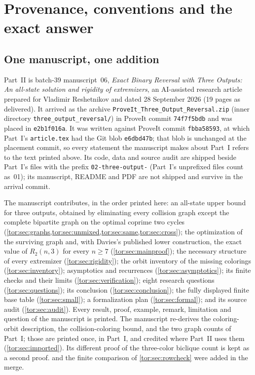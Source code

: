 \documentclass[11pt,a4paper]{article}
\numberwithin{equation}{section}
\theoremstyle{definition}
\theoremstyle{remark}
\begin{document}
\section{Provenance, conventions and the exact answer}\label{tor:sec:intro}

\subsection{One manuscript, one addition}\label{tor:sec:source}

Part~II is batch-39 manuscript~06, \emph{Exact Binary Reversal with Three
Outputs: An all-state solution and rigidity of extremizers}, an AI-assisted
research article prepared for Vladimir Reshetnikov and dated 28 September
2026 (19 pages as delivered). It arrived as the archive
\texttt{ProveIt\_Three\_Output\_Reversal.zip} (inner directory
\texttt{three\_output\_reversal/}) in ProveIt commit \texttt{74f7f5bdb} and was
placed in \texttt{e2b1f016a}. It was written against ProveIt commit
\texttt{fbba58593}, at which Part~I's \texttt{article.tex} had the Git blob
\texttt{e6dbd47b}; that blob is unchanged at the placement commit, so every
statement the manuscript makes about Part~I refers to the text printed above.
Its code, data and source audit are shipped beside Part~I's files with the
prefix \texttt{02-three-output-} (Part~I's unprefixed files count as~01); its
manuscript, README and PDF are not shipped and survive in the arrival commit.

The manuscript contributes, in the order printed here: an all-state upper
bound for three outputs, obtained by eliminating every collision graph except
the complete bipartite graph on the optimal coprime two cycles
(\cref{tor:sec:graphs,tor:sec:unmixed,tor:sec:same,tor:sec:cross}); the
optimization of the surviving graph and, with Davies's published lower
construction, the exact value of $R_2(n,3)$ for every $n\ge7$
(\cref{tor:sec:mainproof}); the necessary structure of every extremizer
(\cref{tor:sec:rigidity}); the orbit inventory of the missing colorings
(\cref{tor:sec:inventory}); asymptotics and recurrences
(\cref{tor:sec:asymptotics}); its finite checks and their limits
(\cref{tor:sec:verification}); eight research questions
(\cref{tor:sec:questions}); its conclusion (\cref{tor:sec:conclusion}); the
fully displayed finite base table (\cref{tor:sec:small}); a formalization plan
(\cref{tor:sec:formal}); and its source audit (\cref{tor:sec:audit}). Every
result, proof, example, remark, limitation and question of the manuscript is
printed. The manuscript re-derives the coloring-orbit description, the
collision-coloring bound, and the two graph counts of Part~I; those are printed
once, in Part~I, and credited where Part~II uses them (\cref{tor:sec:imported}).
Its different proof of the three-color biclique count is kept as a second
proof.  and the finite comparison of \cref{tor:sec:rowcheck}
were added in the merge.
\end{document}
